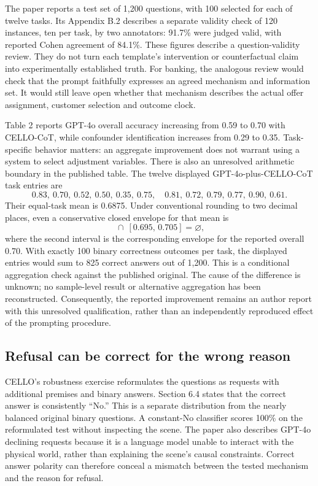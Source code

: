 The paper reports a test set of 1,200 questions, with 100 selected for each of
twelve tasks. Its Appendix B.2 describes a separate validity check of 120
instances, ten per task, by two annotators: 91.7\% were judged valid, with
reported Cohen agreement of 84.1\%. These figures describe a question-validity
review. They do not turn each template's intervention or counterfactual claim
into experimentally established truth. For banking, the analogous review
would check that the prompt faithfully expresses an agreed mechanism and
information set. It would still leave open whether that mechanism describes
the actual offer assignment, customer selection and outcome clock.
\citep{exec17_benchmark_cello}

Table 2 reports GPT-4o overall accuracy increasing from 0.59 to 0.70 with
CELLO-CoT, while confounder identification increases from 0.29 to 0.35.
Task-specific behavior matters: an aggregate improvement does not warrant
using a system to select adjustment variables. There is also an unresolved
arithmetic boundary in the published table. The twelve displayed
GPT-4o-plus-CELLO-CoT task entries are
\[
 0.83,\ 0.70,\ 0.52,\ 0.50,\ 0.35,\ 0.75,
 \quad 0.81,\ 0.72,\ 0.79,\ 0.77,\ 0.90,\ 0.61.
\]
Their equal-task mean is 0.6875. Under conventional rounding to two decimal
places, even a conservative closed envelope for that mean is
\begin{equation}
 [0.6825,\,0.6925]\ \cap\ [0.695,\,0.705]=\varnothing,
 \label{exec17:benchmark-rounding}
\end{equation}
where the second interval is the corresponding envelope for the reported
overall 0.70. With exactly 100 binary correctness outcomes per task, the
displayed entries would sum to 825 correct answers out of 1,200. This is a
conditional aggregation check against the published original. The cause of
the difference is unknown; no sample-level result or alternative aggregation
has been reconstructed. Consequently, the reported improvement remains an
author report with this unresolved qualification, rather than an independently
reproduced effect of the prompting procedure.
\citep{exec17_benchmark_cello,exec17_benchmark_exact}

\subsection{Refusal can be correct for the wrong reason}

CELLO's robustness exercise reformulates the questions as requests with
additional premises and binary answers. Section 6.4 states that the correct
answer is consistently ``No.'' This is a separate distribution from the
nearly balanced original binary questions. A constant-No classifier scores
100\% on the reformulated test without inspecting the scene. The paper also
describes GPT-4o declining requests because it is a language model unable to
interact with the physical world, rather than explaining the scene's causal
constraints. Correct answer polarity can therefore conceal a mismatch
between the tested mechanism and the reason for refusal.
\citep{exec17_benchmark_cello}

